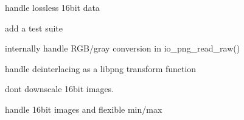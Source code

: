 
\begin{DoxyRefList}
\item[\label{todo__todo000001}%
\Hypertarget{todo__todo000001}%
File \hyperlink{io__png_8c}{io\+\_\+png.c} ]handle lossless 16bit data 

add a test suite 

internally handle R\+G\+B/gray conversion in io\+\_\+png\+\_\+read\+\_\+raw() 

handle deinterlacing as a libpng transform function 
\item[\label{todo__todo000003}%
\Hypertarget{todo__todo000003}%
Member \hyperlink{io__png_8c_a54ce4037b9759d9a8f31c01d3315821d}{io\+\_\+png\+\_\+read\+\_\+u8} (const char $\ast$fname, size\+\_\+t $\ast$nxp, size\+\_\+t $\ast$nyp, size\+\_\+t $\ast$ncp)]don\textquotesingle{}t downscale 16bit images. 
\item[\label{todo__todo000005}%
\Hypertarget{todo__todo000005}%
Member \hyperlink{io__png_8c_a8b49182e70dfd843d7bafbc7a5278172}{io\+\_\+png\+\_\+write\+\_\+f32} (const char $\ast$fname, const float $\ast$data, size\+\_\+t nx, size\+\_\+t ny, size\+\_\+t nc)]handle 16bit images and flexible min/max
\end{DoxyRefList}